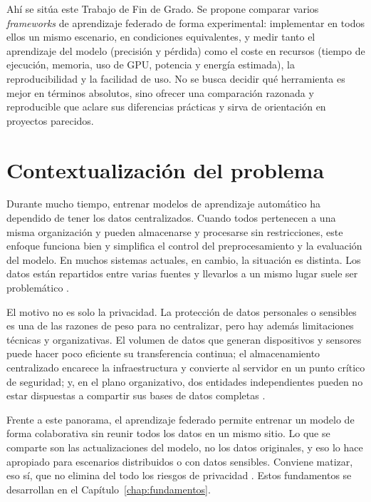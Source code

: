 Ahí se sitúa este Trabajo de Fin de Grado. Se propone comparar varios \textit{frameworks}
de aprendizaje federado de forma experimental: implementar en todos ellos un mismo
escenario, en condiciones equivalentes, y medir tanto el aprendizaje del modelo
(precisión y pérdida) como el coste en recursos (tiempo de ejecución, memoria, uso de
GPU, potencia y energía estimada), la reproducibilidad y la facilidad de uso. No se
busca decidir qué herramienta es mejor en términos absolutos, sino ofrecer una
comparación razonada y reproducible que aclare sus diferencias prácticas y sirva de
orientación en proyectos parecidos.

\section{Contextualización del problema}\label{sec:contextualizacion}

Durante mucho tiempo, entrenar modelos de aprendizaje automático ha dependido de tener
los datos centralizados. Cuando todos pertenecen a una misma organización y pueden
almacenarse y procesarse sin restricciones, este enfoque funciona bien y simplifica el
control del preprocesamiento y la evaluación del modelo. En muchos sistemas actuales, en
cambio, la situación es distinta. Los datos están repartidos entre varias fuentes y
llevarlos a un mismo lugar suele ser problemático \parencite{kairouz2021advances}.

El motivo no es solo la privacidad. La protección de datos personales o sensibles es una
de las razones de peso para no centralizar, pero hay además limitaciones técnicas y
organizativas. El volumen de datos que generan dispositivos y sensores puede hacer poco
eficiente su transferencia continua; el almacenamiento centralizado encarece la
infraestructura y convierte al servidor en un punto crítico de seguridad; y, en el plano
organizativo, dos entidades independientes pueden no estar dispuestas a compartir sus
bases de datos completas \parencite{li2020federated}.

Frente a este panorama, el aprendizaje federado permite entrenar un modelo de forma
colaborativa sin reunir todos los datos en un mismo sitio. Lo que se comparte son las
actualizaciones del modelo, no los datos originales, y eso lo hace apropiado para
escenarios distribuidos o con datos sensibles. Conviene matizar, eso sí, que no elimina
del todo los riesgos de privacidad \parencite{kairouz2021advances}. Estos fundamentos se
desarrollan en el Capítulo~\ref{chap:fundamentos}.

